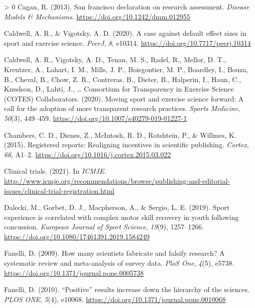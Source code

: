 \documentclass[]{cik}%
\newlength{\cslhangindent}
\newenvironment{CSLReferences}[3] %
 {%
  \setlength{\parindent}{0pt}
  \ifodd #1 \everypar{\setlength{\hangindent}{\cslhangindent}}\ignorespaces\fi
  \ifnum #2 > 0
  \setlength{\parskip}{#2\baselineskip}
  \fi
 }%
 {}
\begin{document}
\begin{CSLReferences}{1}{0}
\leavevmode\hypertarget{ref-DORA2013}{}%
Cagan, R. (2013). San francisco declaration on research assessment.
\emph{Disease Models {\&} Mechanisms}.
\url{https://doi.org/10.1242/dmm.012955}

\leavevmode\hypertarget{ref-Caldwell_Vigotsky_2020}{}%
Caldwell, A. R., \& Vigotsky, A. D. (2020). A case against default
effect sizes in sport and exercise science. \emph{PeerJ}, \emph{8},
e10314. \url{https://doi.org/10.7717/peerj.10314}

\leavevmode\hypertarget{ref-caldwell_moving_2020}{}%
Caldwell, A. R., Vigotsky, A. D., Tenan, M. S., Radel, R., Mellor, D.
T., Kreutzer, A., Lahart, I. M., Mills, J. P., Boisgontier, M. P.,
Boardley, I., Bouza, B., Cheval, B., Chow, Z. R., Contreras, B., Dieter,
B., Halperin, I., Haun, C., Knudson, D., Lahti, J., \ldots{} Consortium
for Transparency in Exercise Science (COTES) Collaborators. (2020).
Moving sport and exercise science forward: A call for the adoption of
more transparent research practices. \emph{Sports Medicine},
\emph{50}(3), 449--459. \url{https://doi.org/10.1007/s40279-019-01227-1}

\leavevmode\hypertarget{ref-chambers_registered_2015}{}%
Chambers, C. D., Dienes, Z., McIntosh, R. D., Rotshtein, P., \& Willmes,
K. (2015). Registered reports: Realigning incentives in scientific
publishing. \emph{Cortex}, \emph{66}, A1--2.
\url{https://doi.org/10.1016/j.cortex.2015.03.022}

\leavevmode\hypertarget{ref-icmje}{}%
Clinical trials. (2021). In \emph{ICMJE}.
\url{http://www.icmje.org/recommendations/browse/publishing-and-editorial-issues/clinical-trial-registration.html}

\leavevmode\hypertarget{ref-Dalecki2019}{}%
Dalecki, M., Gorbet, D. J., Macpherson, A., \& Sergio, L. E. (2019).
Sport experience is correlated with complex motor skill recovery in
youth following concussion. \emph{European Journal of Sport Science},
\emph{19}(9), 1257--1266.
\url{https://doi.org/10.1080/17461391.2019.1584249}

\leavevmode\hypertarget{ref-fanelli_how_2009}{}%
Fanelli, D. (2009). How many scientists fabricate and falsify research?
{A} systematic review and meta-analysis of survey data. \emph{PloS One},
\emph{4}(5), e5738. \url{https://doi.org/10.1371/journal.pone.0005738}

\leavevmode\hypertarget{ref-fanelli_positive_2010}{}%
Fanelli, D. (2010). {``{Positive}''} results increase down the hierarchy
of the sciences. \emph{PLOS ONE}, \emph{5}(4), e10068.
\url{https://doi.org/10.1371/journal.pone.0010068}


\end{CSLReferences}
\end{document}
